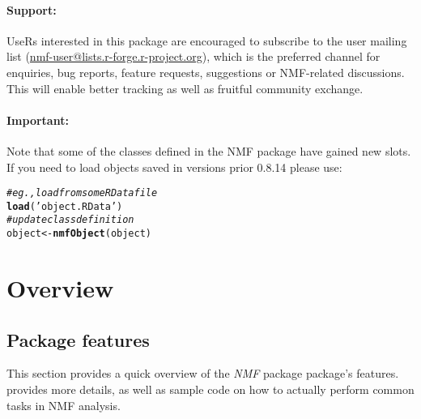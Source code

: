 \documentclass[a4paper]{article}\usepackage[]{graphicx}\usepackage[]{color}
\makeatletter
\newcommand{\hlstr}[1]{\textcolor[rgb]{0.192,0.494,0.8}{#1}}%
\newcommand{\hlcom}[1]{\textcolor[rgb]{0.678,0.584,0.686}{\textit{#1}}}%
\newcommand{\hlstd}[1]{\textcolor[rgb]{0.345,0.345,0.345}{#1}}%
\newcommand{\hlkwb}[1]{\textcolor[rgb]{0.69,0.353,0.396}{#1}}%
\newcommand{\hlkwd}[1]{\textcolor[rgb]{0.737,0.353,0.396}{\textbf{#1}}}%
\newenvironment{kframe}{%
 \def\at@end@of@kframe{}%
 \ifinner\ifhmode%
  \def\at@end@of@kframe{\end{minipage}}%
  \begin{minipage}{\columnwidth}%
 \fi\fi%
 \def\FrameCommand##1{\hskip\@totalleftmargin \hskip-\fboxsep
 \colorbox{shadecolor}{##1}\hskip-\fboxsep
     \hskip-\linewidth \hskip-\@totalleftmargin \hskip\columnwidth}%
 \MakeFramed {\advance\hsize-\width
   \@totalleftmargin\z@ \linewidth\hsize
   \@setminipage}}%
 {\par\unskip\endMakeFramed%
 \at@end@of@kframe}
\newenvironment{knitrout}{}{} %
\newcommand{\pkgname}[1]{\textit{#1}\xspace}
\newcommand{\Rpkg}[1]{\pkgname{#1} package\xspace}
\newcommand{\nmfpack}{\Rpkg{NMF}}
\makeatother
\begin{document}
\paragraph{Support:} UseRs interested in this package are encouraged to subscribe to the user mailing list (\href{https://lists.r-forge.r-project.org/mailman/listinfo/nmf-user}{nmf-user@lists.r-forge.r-project.org}), which is the preferred channel for enquiries, bug reports, feature requests, suggestions or NMF-related discussions.
This will enable better tracking as well as fruitful community exchange.

\paragraph{Important:} Note that some of the classes defined in the NMF package have gained new slots.
If you need to load objects saved in versions prior 0.8.14 please use:

\begin{knitrout}
\color{fgcolor}\begin{kframe}
\begin{alltt}
\hlcom{# eg., load from some RData file}
\hlkwd{load}\hlstd{(}\hlstr{'object.RData'}\hlstd{)}
\hlcom{# update class definition}
\hlstd{object} \hlkwb{<-} \hlkwd{nmfObject}\hlstd{(object)}
\end{alltt}
\end{kframe}
\end{knitrout}

\pagebreak
\tableofcontents
\pagebreak

\section{Overview}

\subsection{Package features}

This section provides a quick overview of the \nmfpack package's features.
 provides more details, as well as sample code on how to actually perform common tasks in NMF analysis.
\end{document}
